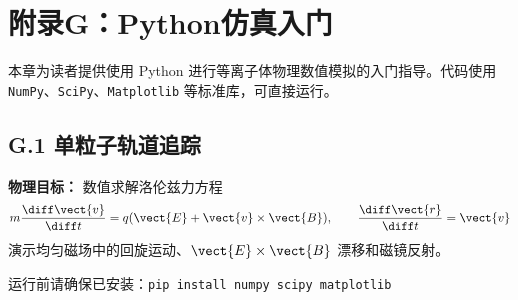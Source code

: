 \chapter*{附录G：Python仿真入门}

本章为读者提供使用 Python 进行等离子体物理数值模拟的入门指导。代码使用 \texttt{NumPy}、\texttt{SciPy}、\texttt{Matplotlib} 等标准库，可直接运行。


\section{G.1 单粒子轨道追踪}

\textbf{物理目标：} 数值求解洛伦兹力方程
\begin{equation}
m\frac{\diff\vect{v}}{\diff t} = q(\vect{E}+\vect{v}\times\vect{B}), \qquad \frac{\diff\vect{r}}{\diff t} = \vect{v}
\end{equation}
演示均匀磁场中的回旋运动、$\vect{E}\times\vect{B}$ 漂移和磁镜反射。

\begin{tip}
运行前请确保已安装：\texttt{pip install numpy scipy matplotlib}
\end{tip}

